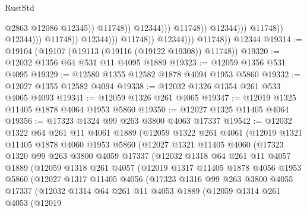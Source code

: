 \begin{lexlean}{RustStd}
\begin{coremodule}
                                                              @2863
                                                              @12086
                                                              @12345))
                                                          @11748))
                                                      @12344)))
                                                @11748))
                                            @12344)))
                                      @11748))
                                  @12344)))
                            @11748))
                        @12344)))
                  @11748))
              @12344)))
        @11748))
    @12344
@19314 := @19104 (@19107 (@19113 (@19116 (@19122 @19308)) @11748))
@19320 := @12032 @1356 @64 @531 @11 @4095 @1889
@19323 := @12059 @1356 @531 @4095
@19329 := @12580 @1355 @12582 @1878 @4094 @1953 @5860
@19332 := @12027 @1355 @12582 @4094
@19338 := @12032 @1326 @1354 @261 @533 @4065 @4093
@19341 := @12059 @1326 @261 @4065
@19347 := @12019 @1325 @11405 @1878 @4064 @1953 @5860
@19350 := @12027 @1325 @11405 @4064
@19356 := @17323 @1324 @99 @263 @3800 @4063 @17337
@19542 := @12032
    @1322
    @64
    @261
    @11
    @4061
    @1889
    (@12059
      @1322
      @261
      @4061
      (@12019
        @1321
        @11405
        @1878
        @4060
        @1953
        @5860
        (@12027
          @1321
          @11405
          @4060
          (@17323
            @1320
            @99
            @263
            @3800
            @4059
            @17337
            (@12032
              @1318
              @64
              @261
              @11
              @4057
              @1889
              (@12059
                @1318
                @261
                @4057
                (@12019
                  @1317
                  @11405
                  @1878
                  @4056
                  @1953
                  @5860
                  (@12027
                    @1317
                    @11405
                    @4056
                    (@17323
                      @1316
                      @99
                      @263
                      @3800
                      @4055
                      @17337
                      (@12032
                        @1314
                        @64
                        @261
                        @11
                        @4053
                        @1889
                        (@12059
                          @1314
                          @261
                          @4053
                          (@12019

\end{coremodule}
\end{lexlean}
